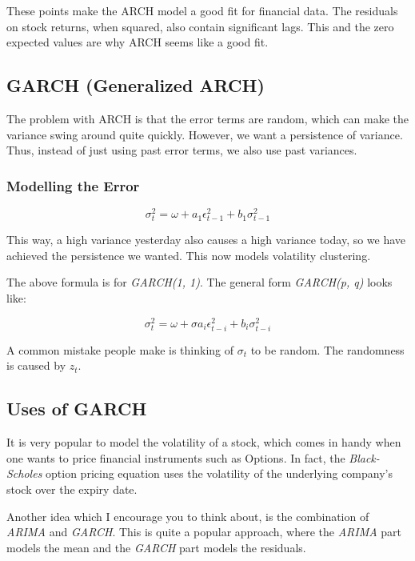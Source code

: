 These points make the ARCH model a good fit for financial data. The residuals on stock returns, when squared, also contain significant lags. This and the zero expected values are why ARCH seems like a good fit.

\subsection{GARCH (Generalized ARCH)}

The problem with ARCH is that the error terms are random, which can make the variance swing around quite quickly. However, we want a persistence of variance. Thus, instead of just using past error terms, we also use past variances.

\subsubsection{Modelling the Error}

\[
\sigma^2_t = \omega + a_1 \epsilon^2_{t-1} + b_1 \sigma^2_{t-1}
\]

This way, a high variance yesterday also causes a high variance today, so we have achieved the persistence we wanted. This now models volatility clustering.

The above formula is for \emph{GARCH(1, 1)}. The general form \emph{GARCH(p, q)} looks like:

\[
\sigma^2_t = \omega + \sigma a_i \epsilon^2_{t-i} + b_i \sigma^2_{t-i}
\]

A common mistake people make is thinking of $\sigma_t$ to be random. The randomness is caused by $z_t$.

\subsection{Uses of GARCH}

It is very popular to model the volatility of a stock, which comes in handy when one wants to price financial instruments such as Options. In fact, the \emph{Black-Scholes} option pricing equation uses the volatility of the underlying company’s stock over the expiry date.

Another idea which I encourage you to think about, is the combination of \emph{ARIMA} and \emph{GARCH}. This is quite a popular approach, where the \emph{ARIMA} part models the mean and the \emph{GARCH} part models the residuals.
